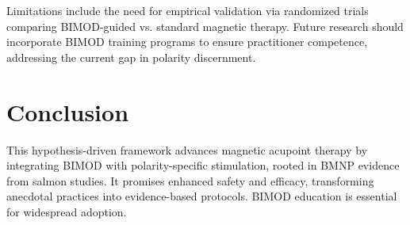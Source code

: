 \documentclass{article}
\begin{document}
Limitations include the need for empirical validation via randomized trials comparing BIMOD-guided vs. standard magnetic therapy. Future research should incorporate BIMOD training programs to ensure practitioner competence, addressing the current gap in polarity discernment.

\section{Conclusion}
This hypothesis-driven framework advances magnetic acupoint therapy by integrating BIMOD with polarity-specific stimulation, rooted in BMNP evidence from salmon studies. It promises enhanced safety and efficacy, transforming anecdotal practices into evidence-based protocols. BIMOD education is essential for widespread adoption.


\end{document}
